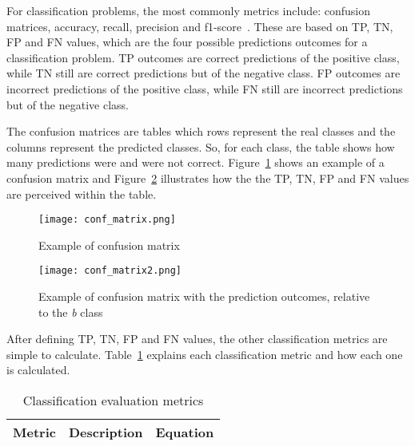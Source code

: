 \begin{enumerate}
    For classification problems, the most commonly metrics include: confusion matrices, accuracy, recall, precision and f1-score~\cite{Liu2014AEvaluation}. These are based on \gls{TP}, \gls{TN}, \gls{FP} and \gls{FN} values, which are the four possible predictions outcomes for a classification problem. \gls{TP} outcomes are correct predictions of the positive class, while \gls{TN} still are correct predictions but of the negative class. \gls{FP} outcomes are incorrect predictions of the positive class, while \gls{FN} still are incorrect predictions but of the negative class. 
    
    The confusion matrices are tables which rows represent the real classes and the columns represent the predicted classes. So, for each class, the table shows how many predictions were and were not correct. Figure~\ref{fig:conf_matrix} shows an example of a confusion matrix and Figure~\ref{fig:conf_matrix2} illustrates how the the \gls{TP}, \gls{TN}, \gls{FP} and \gls{FN} values are perceived within the table.
    
    \begin{figure}[htbp]
        \centering
        \texttt{[image: conf\_matrix.png]}
        \caption{Example of confusion matrix~\cite{Grandini2020MetricsOverview}}
        \label{fig:conf_matrix}
    \end{figure}
    
    \begin{figure}[htbp]
        \centering
        \texttt{[image: conf\_matrix2.png]}
        \caption{Example of confusion matrix with the prediction outcomes, relative to the \textit{b} class~\cite{Grandini2020MetricsOverview}}
        \label{fig:conf_matrix2}
    \end{figure}
    
    After defining \gls{TP}, \gls{TN}, \gls{FP} and \gls{FN} values, the other classification metrics are simple to calculate. Table~\ref{tab:classification_metrics} explains each classification metric and how each one is calculated.
    
    \begin{table}[ht]
    	\caption{Classification evaluation metrics}
        \label{tab:classification_metrics}
    \centering
    \begin{tabular}{p{2.5cm}cc}
    	\toprule
    	\multicolumn{1}{c}{\textbf{Metric}} & \textbf{Description} & \textbf{Equation} \\
    	\midrule
    	

\end{tabular}
\end{table}
\end{enumerate}
